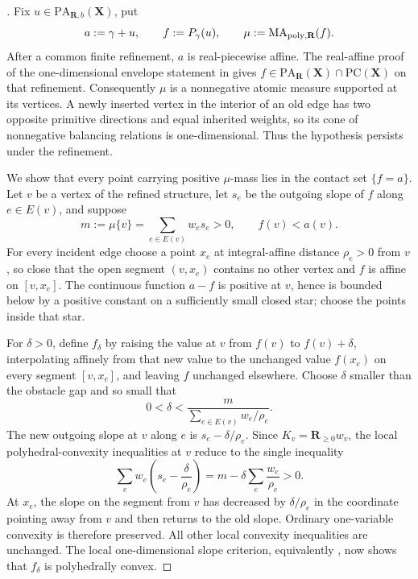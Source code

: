 
\begin{proof}[]
Fix $u\in\mathrm{PA}_{\mathbf R,b}(\mathbf X)$, put
\[
 a:=\gamma+u,
 \qquad
 f:=P_\gamma(u),
 \qquad
 \mu:=\operatorname{MA}_{\mathrm{poly},\mathbf R}(f).
\]
After a common finite refinement, $a$ is real-piecewise affine.  The
real-affine proof of the one-dimensional envelope statement in
\cite[Proposition~6.13]{BMPS26} gives
$f\in\mathrm{PA}_{\mathbf R}(\mathbf X)\cap\mathrm{PC}(\mathbf X)$
on that refinement.  Consequently $\mu$ is a nonnegative atomic measure
supported at its vertices.  A newly inserted vertex in the interior of an
old edge has two opposite primitive directions and equal inherited weights,
so its cone of nonnegative balancing relations is one-dimensional.  Thus the
hypothesis persists under the refinement.

We show that every point carrying positive $\mu$-mass lies in the contact
set $\{f=a\}$.  Let $v$ be a vertex of the refined structure, let $s_e$ be
the outgoing slope of $f$ along $e\in E(v)$, and suppose
\[
 m:=\mu\{v\}=\sum_{e\in E(v)}w_es_e>0,
 \qquad
 f(v)<a(v).
\]
For every incident edge choose a point $x_e$ at integral-affine distance
$\rho_e>0$ from $v$, so close that the open segment $(v,x_e)$ contains no
other vertex and $f$ is affine on $[v,x_e]$.  The continuous function
$a-f$ is positive at $v$, hence is bounded below by a positive constant on
a sufficiently small closed star; choose the points inside that star.

For $\delta>0$, define $f_\delta$ by raising the value at $v$ from $f(v)$
to $f(v)+\delta$, interpolating affinely from that new value to the unchanged
value $f(x_e)$ on every segment $[v,x_e]$, and leaving $f$ unchanged
elsewhere.  Choose $\delta$ smaller than the obstacle gap and so small that
\[
 0<\delta<
 \frac{m}{\sum_{e\in E(v)}w_e/\rho_e}.
\]
The new outgoing slope at $v$ along $e$ is
$s_e-\delta/\rho_e$.  Since $K_v=\mathbf R_{\geq0}w_v$, the local
polyhedral-convexity inequalities at $v$ reduce to the single inequality
\[
 \sum_e w_e\left(s_e-\frac{\delta}{\rho_e}\right)
 =m-\delta\sum_e\frac{w_e}{\rho_e}>0.
\]
At $x_e$, the slope on the segment from $v$ has decreased by
$\delta/\rho_e$ in the coordinate pointing away from $v$ and then returns
to the old slope.  Ordinary one-variable convexity is therefore preserved.
All other local convexity inequalities are unchanged.  The local
one-dimensional slope criterion, equivalently
\cite[Definitions~3.1--3.3 and Lemma~3.4]{BMPS26}, now shows that
$f_\delta$ is polyhedrally convex.


\end{proof}

